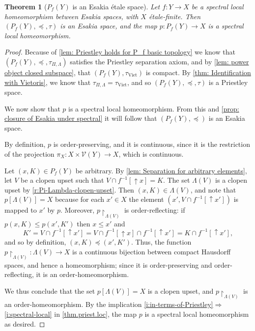 \documentclass[12pt]{amsart}
\theoremstyle{plain}
\newtheorem{theorem}{Theorem}[section]
\theoremstyle{definition}
\newcommand{\Viet}{\mathrm{Viet}}
\renewcommand{\u}{{\uparrow}}
\begin{document}
\begin{theorem}[$P_f(Y)$ is an Esakia étale space]\label{t:spectralochomeoforpower}
     Let $f \colon Y \to X$ be a spectral local homeomorphism between Esakia spaces, with $X$ étale-finite.
     Then $(P_{f}(Y),\preceq,\tau)$ is an Esakia space, and the map $p \colon P_{f}(Y)\to X$ is a spectral local homeomorphism.
\end{theorem}
\begin{proof}
    Because of \cref{lem: Priestley holds for P_f basic topology} we know that $(P_{f}(Y),\preceq,\tau_{\Pi,\Lambda})$ satisfies the Priestley separation axiom, and by \cref{lem: power object closed subspace}, that $(P_{f}(Y),\tau_{\Viet})$ is compact. By \cref{thm: Identification with Vietoris}, we know that $\tau_{\Pi,\Lambda}=\tau_{\Viet}$, and so $(P_{f}(Y),\preceq,\tau)$ is a Priestley space.
    
    We now show that $p$ is a spectral local homeomorphism. From this and \cref{prop: closure of Esakia under spectral} it will follow that $(P_{f}(Y),\preceq)$ is an Esakia space.
    
    By definition, $p$ is order-preserving, and it is continuous, since it is the restriction of the projection $\pi_{X}\colon X\times \mathcal{V}(Y)\to X$, which is continuous.

    Let $(x,K)\in P_{f}(Y)$ be arbitrary. By \cref{lem: Separation for arbitrary elements}, let $V$ be a clopen upset such that $V\cap f^{-1}[{\u} x] = K$. The set $\Lambda(V)$ is a clopen upset by \cref{r:Pi-Lambda-clopen-upset}.
    Then $(x,K)\in\Lambda(V)$, and note that $p[\Lambda(V)]=X$ because for each $x' \in X$ the element $(x', V \cap f^{-1}[\u x'])$ is mapped to $x'$ by $p$. Moreover, $p{\restriction}_{\Lambda(V)}$ is order-reflecting: if $p(x,K)\leq p(x',K')$ then $x\leq x'$ and
    \begin{equation*}
        K' = V \cap f^{-1}[{\u}x'] = V \cap f^{-1}[{\u}x] \cap f^{-1}[{\u}x'] = K \cap f^{-1}[{\u}x'],
    \end{equation*}
    and so by definition, $(x,K)\preceq (x',K')$. Thus, the function $p{\restriction}_{\Lambda(V)} \colon \Lambda(V) \to X$ is a continuous bijection between compact Hausdorff spaces, and hence a homeomorphism; since it is order-preserving and order-reflecting, it is an order-homeomorphism.

    We thus conclude that the set $p[\Lambda(V)] = X$ is a clopen upset, and $p{\restriction}_{\Lambda(V)}$ is an order-homeomorphism.   
    By the implication \eqref{i:in-terms-of-Priestley}$\Rightarrow$\eqref{i:spectral-local} in \cref{thm.priest.loc}, the map $p$ is a spectral local homeomorphism as desired.
\end{proof}
\end{document}
